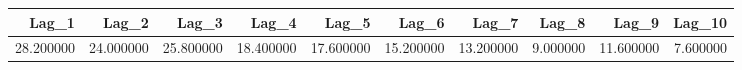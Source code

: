 \begin{tabular}{rrrrrrrrrr}
\toprule
Lag_1 & Lag_2 & Lag_3 & Lag_4 & Lag_5 & Lag_6 & Lag_7 & Lag_8 & Lag_9 & Lag_10 \\
\midrule
28.200000 & 24.000000 & 25.800000 & 18.400000 & 17.600000 & 15.200000 & 13.200000 & 9.000000 & 11.600000 & 7.600000 \\
\bottomrule
\end{tabular}
